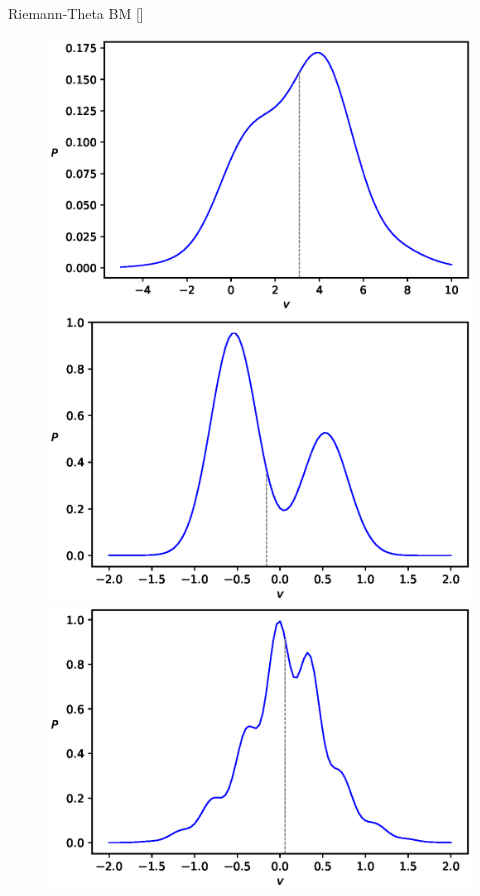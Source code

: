 \documentclass[10pt]{beamer}
\begin{document}
\begin{frame}{Riemann-Theta BM \hfill \small [\cite{2020}]}
\begin{figure}
\begin{center}
          \includegraphics[scale=0.25]{figures/PvPhaseI-3}
          \includegraphics[scale=0.25]{figures/PvPhaseII-1}
          \includegraphics[scale=0.25]{figures/PvPhaseII-2}

\end{center}
\end{figure}
\end{frame}
\end{document}
